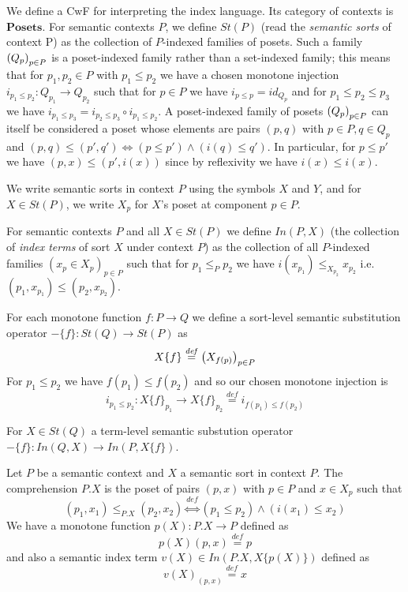 \documentclass{article}
\newcommand{\mbf}{\mathbf}
\newcommand{\defeq}{\overset{\mathit{def}}{=}}
\newcommand{\defequiv}{\overset{\mathit{def}}{\Leftrightarrow}}
\newcommand{\fm}[2]{
\left(
\tiny
#1
\normalsize
\right)_{#2}
}
\begin{document}
We define a CwF for interpreting the index language. Its category of contexts is $\mbf{Posets}$. For semantic contexts $P$, we define $\mathit{St}(P)$ (read the \emph{semantic sorts} of context P) as the collection of $P$-indexed families of posets. Such a family $\fm{Q_p}{p \in P}$ is a poset-indexed family rather than a set-indexed family; this means that for $p_1,p_2 \in P$ with $p_1 \leq p_2$ we have a chosen monotone injection $i_{p_1 \leq p_2} : Q_{p_1} \to Q_{p_2}$ such that for $p \in P$ we have $i_{p \leq p} = \mathit{id}_{Q_p}$ and for $p_1 \leq p_2 \leq p_3$ we have $i_{p_1 \leq p_3} = i_{p_2 \leq p_3} \circ i_{p_1 \leq p_2}$.
A poset-indexed family of posets $\fm{Q_p}{p \in P}$ can itself be considered a poset whose elements are pairs $(p,q)$ with $p \in P, q \in Q_p$ and $(p,q) \leq (p',q') \Leftrightarrow (p \leq p') \wedge (i(q) \leq q')$. In particular, for $p \leq p'$ we have $(p, x) \leq (p', i(x))$ since by reflexivity we have $i(x) \leq i(x)$.

 We write semantic sorts in context $P$ using the symbols $X$ and $Y$, and for $X \in \mathit{St}(P)$, we write $X_p$ for $X$'s poset at component $p \in P$. 


For semantic contexts $P$ and all $X \in \mathit{St}(P)$ we define $\mathit{In}(P, X)$ (the collection of \emph{index terms} of sort $X$ under context $P$) as the collection of all $P$-indexed families $(x_p \in X_p)_{p \in P}$ such that for $p_1 \leq_P p_2$ we have $i(x_{p_1}) \leq_{X_{p_2}} x_{p_2}$ i.e. $(p_1, x_{p_1}) \leq (p_2, x_{p_2})$.  

For each monotone function $f : P \to Q$ we define a sort-level semantic substitution operator $- \{ f \} : \mathit{St}(Q) \to \mathit{St}(P)$ as 
$$X \{ f \} \defeq \fm{X_{f(p)}}{p \in P}$$
For $p_1 \leq p_2$ we have $f(p_1) \leq f(p_2)$ and so our chosen monotone injection is 
$$i_{p_1 \leq p_2} : X\{ f \}_{p_1} \to X \{ f \}_{p_2} \defeq i_{f(p_1) \leq f(p_2)}$$

For $X \in \mathit{St}(Q)$ a term-level semantic substution operator $- \{ f \} : \mathit{In}(Q,X) \to \mathit{In}(P, X \{ f \})$.

Let $P$ be a semantic context and $X$ a semantic sort in context $P$. The comprehension $P . X$ is the poset of pairs $(p,x)$ with $p \in P$ and $x \in X_p$ such that 
$$(p_1,x_1) \leq_{P.X} (p_2,x_2) \defequiv (p_1 \leq p_2) \wedge (i(x_1) \leq x_2)$$
We have a monotone function $p(X) : P . X \to P$ defined as 
$$p(X)(p,x) \defeq p$$
and also a semantic index term $v(X) \in \mathit{In}(P.X, X \{ p(X) \})$ defined as
$$v(X)_{(p,x)} \defeq x$$
\end{document}
